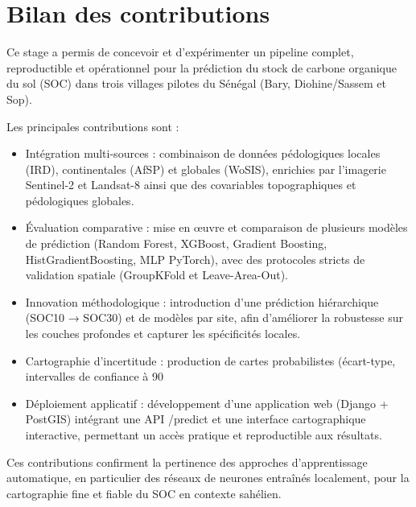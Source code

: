 \documentclass[12pt,a4paper,oneside]{report}
\begin{document}
\section{Bilan des contributions}
Ce stage a permis de concevoir et d’expérimenter un pipeline complet, reproductible et opérationnel pour la prédiction du stock de carbone organique du sol (SOC) dans trois villages pilotes du Sénégal (Bary, Diohine/Sassem et Sop).

Les principales contributions sont :
\begin{itemize}
  \item Intégration multi-sources : combinaison de données pédologiques locales (IRD), continentales (AfSP) et globales (WoSIS), enrichies par l’imagerie Sentinel-2 et Landsat-8 ainsi que des covariables topographiques et pédologiques globales.

  \item Évaluation comparative : mise en œuvre et comparaison de plusieurs modèles de prédiction (Random Forest, XGBoost, Gradient Boosting, HistGradientBoosting, MLP PyTorch), avec des protocoles stricts de validation spatiale (GroupKFold et Leave-Area-Out).

  \item Innovation méthodologique : introduction d’une prédiction hiérarchique (SOC10 → SOC30) et de modèles par site, afin d’améliorer la robustesse sur les couches profondes et capturer les spécificités locales.

  \item Cartographie d’incertitude : production de cartes probabilistes (écart-type, intervalles de confiance à 90 %

  \item Déploiement applicatif : développement d’une application web (Django + PostGIS) intégrant une API /predict et une interface cartographique interactive, permettant un accès pratique et reproductible aux résultats.

\end{itemize}

Ces contributions confirment la pertinence des approches d’apprentissage automatique, en particulier des réseaux de neurones entraînés localement, pour la cartographie fine et fiable du SOC en contexte sahélien.
\end{document}
